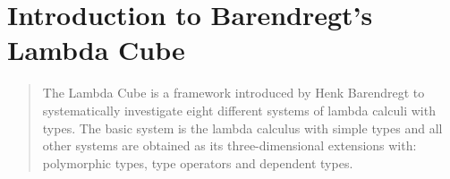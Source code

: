 \section{Introduction to Barendregt's Lambda Cube}
\begin{abstract}
	The Lambda Cube is a framework introduced by Henk Barendregt to systematically investigate eight different systems of lambda calculi with types. The basic system is the lambda calculus with simple types and all other systems are obtained as its three-dimensional extensions with: polymorphic types, type operators and dependent types.
\end{abstract}
